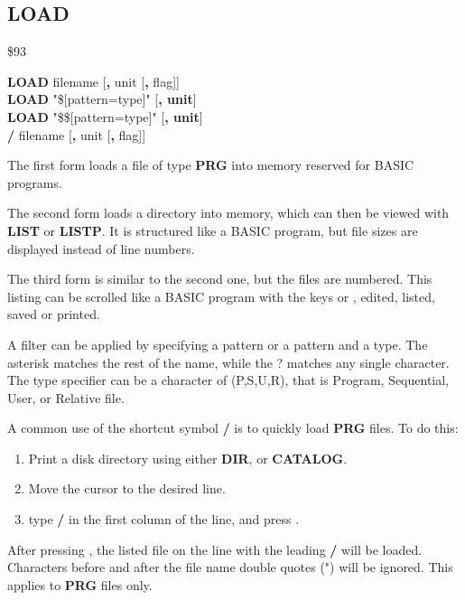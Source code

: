 
\newpage
\subsection{LOAD}
\begin{description}[leftmargin=2cm,style=nextline]
\item [Token:] \$93
\item [Format:] {\bf LOAD} filename [{\bf,} unit [{\bf,} flag]] \\
                {\bf LOAD} "\$[pattern=type]" [{\bf, unit}] \\
                {\bf LOAD} "\$\$[pattern=type]" [{\bf, unit}] \\
                {\bf /} filename [{\bf,} unit [{\bf,} flag]]

\item [Usage:] The first form loads a file of type
   {\bf PRG} into memory reserved for BASIC programs.

The second form loads a directory into memory, which can then be viewed
with {\bf LIST} or {\bf LISTP}. It is structured like a BASIC program,
but file sizes are displayed instead of line numbers.

The third form is similar to the second one, but the files are numbered.
This listing can be scrolled like a BASIC program with the keys 
or , edited, listed, saved or printed.

A filter can be applied by specifying a pattern or a pattern and a type.
The asterisk \* matches the rest of the name, while the ? matches any single character.
The type specifier can be a character of (P,S,U,R), that is Program, Sequential, User,
or Relative file.

   A common use of the shortcut symbol {\bf /} is to quickly load
   {\bf PRG} files. To do this:

    \begin{enumerate}
    \item Print a disk directory using either {\bf DIR}, or {\bf CATALOG}.
    \item Move the cursor to the desired line.
    \item type {\bf /} in the first column of the line, and press .
    \end{enumerate}
   After pressing , the listed file on the line
    with the leading {\bf /} will be loaded.
    Characters before and after the file name double quotes (") will be ignored.
   This applies to {\bf PRG} files only.


\end{description}
